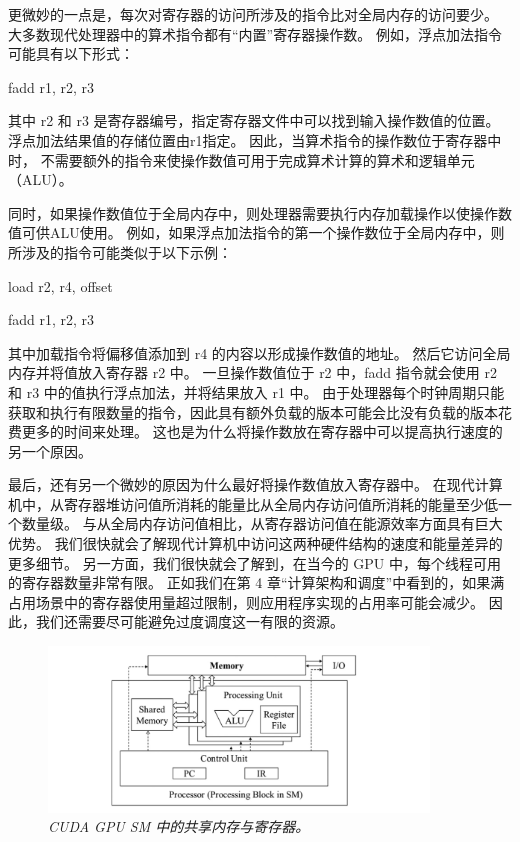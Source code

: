 更微妙的一点是，每次对寄存器的访问所涉及的指令比对全局内存的访问要少。 
大多数现代处理器中的算术指令都有“内置”寄存器操作数。 例如，浮点加法指令可能具有以下形式：

fadd r1, r2, r3

其中 r2 和 r3 是寄存器编号，指定寄存器文件中可以找到输入操作数值的位置。 
浮点加法结果值的存储位置由r1指定。 因此，当算术指令的操作数位于寄存器中时，
不需要额外的指令来使操作数值可用于完成算术计算的算术和逻辑单元（ALU）。

同时，如果操作数值位于全局内存中，则处理器需要执行内存加载操作以使操作数值可供ALU使用。 
例如，如果浮点加法指令的第一个操作数位于全局内存中，则所涉及的指令可能类似于以下示例：

load r2, r4, offset

fadd r1, r2, r3

其中加载指令将偏移值添加到 r4 的内容以形成操作数值的地址。 然后它访问全局内存并将值放入寄存器 r2 中。 
一旦操作数值位于 r2 中，fadd 指令就会使用 r2 和 r3 中的值执行浮点加法，并将结果放入 r1 中。 
由于处理器每个时钟周期只能获取和执行有限数量的指令，因此具有额外负载的版本可能会比没有负载的版本花费更多的时间来处理。 
这也是为什么将操作数放在寄存器中可以提高执行速度的另一个原因。

最后，还有另一个微妙的原因为什么最好将操作数值放入寄存器中。 
在现代计算机中，从寄存器堆访问值所消耗的能量比从全局内存访问值所消耗的能量至少低一个数量级。 
与从全局内存访问值相比，从寄存器访问值在能源效率方面具有巨大优势。 
我们很快就会了解现代计算机中访问这两种硬件结构的速度和能量差异的更多细节。 
另一方面，我们很快就会了解到，在当今的 GPU 中，每个线程可用的寄存器数量非常有限。 
正如我们在第 4 章“计算架构和调度”中看到的，如果满占用场景中的寄存器使用量超过限制，则应用程序实现的占用率可能会减少。 
因此，我们还需要尽可能避免过度调度这一有限的资源。

\begin{figure}[H]
	\centering
	\includegraphics[width=0.9\textwidth]{figs/F5.4.png}
	\caption{\textit{CUDA GPU SM 中的共享内存与寄存器。}}
\end{figure}

